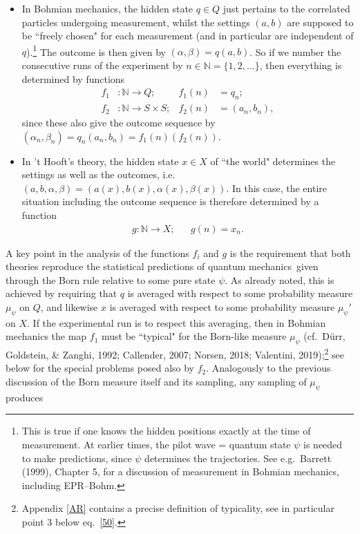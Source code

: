 \documentclass[12pt]{article}
\numberwithin{equation}{section}
\newcommand{\qm}{quantum mechanics}
\newcommand{\er}{\eqref}
\newcommand{\raw}{\rightarrow}
\newcommand{\x}{\times}
\newcommand{\al}{\alpha} \newcommand{\bt}{L\beta}
\newcommand{\N}{{\mathbb N}} \newcommand{\R}{{\mathbb R}}
\begin{document}
\begin{itemize}
\item In Bohmian mechanics, 
 the hidden state $q\in Q$ just pertains to the correlated particles undergoing measurement, whilst  the settings $(a,b)$ are supposed to be ``freely chosen" for each measurement (and in particular are independent of $q$).\footnote{This
 is true if one knows the hidden positions exactly at the time of measurement. At earlier times, the pilot wave = quantum state $\psi$ is needed to make predictions, since $\psi$ determines the trajectories. See e.g.\ Barrett (1999), Chapter 5, for a  discussion of measurement in Bohmian mechanics, including EPR--Bohm.}
  The outcome is then given by  $(\al,\beta)=q(a,b)$. So if we number the consecutive runs of the experiment by $n\in\N=\{1,2, \ldots\}$, then
everything is determined by  functions
 \begin{align}
f_1&: \N \raw Q; & f_1(n)&=q_n;\\
f_2&: \N\raw S\x S; & f_2(n)&=(a_n,b_n), \label{Bsettings}
\end{align}
since these also give the outcome sequence by $(\al_n,\beta_n)=q_n(a_n,b_n)=f_1(n)(f_2(n))$.
 \item    In  't Hooft's  theory, the hidden state $x\in X$ of ``the world" determines the settings as well as the outcomes, i.e.\  $(a,b,\al,\beta)=(a(x),b(x),\al(x),\beta(x))$.  In this case,  the entire situation including the outcome sequence is therefore  determined by a function
  \begin{align}
g: \N\raw X; && g(n)= x_n.
\end{align}
\end{itemize}
A key point in the analysis of the functions $f_i$ and $g$ is the requirement that both theories reproduce the statistical predictions of \qm\ given through the Born rule relative to some pure state $\psi$. As already noted, this is achieved by requiring that $q$ is averaged with respect to some probability measure $\mu_{\psi}$ on $Q$, and likewise $x$ is  averaged with respect to some probability measure $\mu_{\psi}'$ on $X$. If the experimental run is to respect this averaging,  then in Bohmian mechanics
 the map $f_1$  must be ``typical" for the Born-like measure $\mu_{\psi}$ 
(cf.\  D\"{u}rr, Goldstein, \& Zanghi, 1992; Callender, 2007;  Norsen, 2018; Valentini, 2019);\footnote{Appendix \ref{AR} contains a precise
definition of typicality, see in particular point 3 below eq.\ \er{50}.}
 see below for the special problems posed also by $f_2$.
 Analogously to the previous discussion of the Born measure itself and its sampling, any sampling of $\mu_{\psi}$  produces
\end{document}
